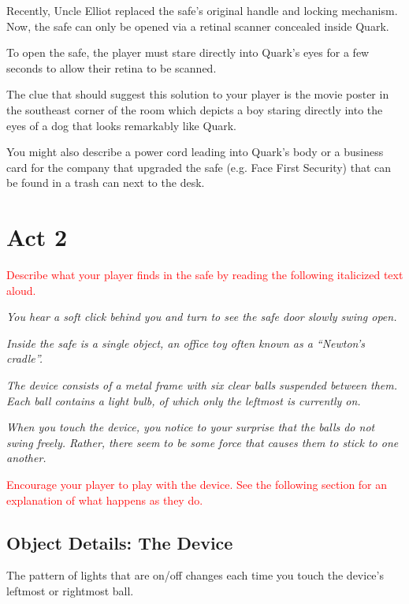 \documentclass[a6paper, parskip=half, DIV=14, 12pt]{scrartcl}
\begin{document}
Recently, Uncle Elliot replaced the safe's original handle and locking mechanism.
Now, the safe can only be opened via a retinal scanner concealed inside Quark.

To open the safe, the player must stare directly into Quark's eyes for a few seconds to allow their retina to be scanned.

The clue that should suggest this solution to your player is the movie poster in the southeast corner of the room which depicts a boy staring directly into the eyes of a dog that looks remarkably like Quark.

You might also describe a power cord leading into Quark's body or a business card for the company that upgraded the safe (e.g. Face First Security) that can be found in a trash can next to the desk. 

\newpage

\section*{Act 2}
\textcolor{Red}{Describe what your player finds in the safe by reading the following italicized text aloud.}

\textit{You hear a soft click behind you and turn to see the safe door slowly swing open.}

\textit{Inside the safe is a single object, an office toy often known as a ``Newton's cradle''.}

\textit{The device consists of a metal frame with six clear balls suspended between them. Each ball contains a light bulb, of which only the leftmost is currently on.}

\textit{When you touch the device, you notice to your surprise that the balls do not swing freely. Rather, there seem to be some force that causes them to stick to one another.}

\textcolor{Red}{Encourage your player to play with the device. See the following section for an explanation of what happens as they do.}

\newpage

\subsection*{Object Details: The Device}
The pattern of lights that are on/off changes each time you touch the device's leftmost or rightmost ball. 
\end{document}
